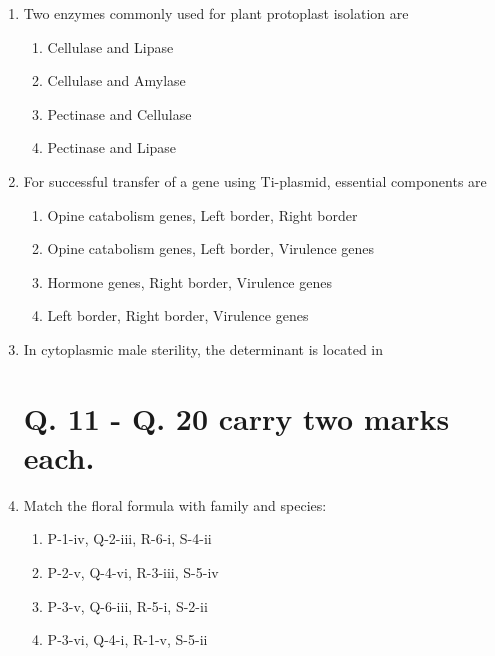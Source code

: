 \documentclass[journal]{IEEEtran}
\begin{document}
\begin{enumerate}
\item Two enzymes commonly used for plant protoplast isolation are\hfill  \textit{}
\begin{enumerate}
    \item Cellulase and Lipase
    \item Cellulase and Amylase
    \item Pectinase and Cellulase
    \item Pectinase and Lipase
\end{enumerate}

\item For successful transfer of a gene using Ti-plasmid, essential components are\hfill  \textit{}
\begin{enumerate}
    \item Opine catabolism genes, Left border, Right border
    \item Opine catabolism genes, Left border, Virulence genes
    \item Hormone genes, Right border, Virulence genes
    \item Left border, Right border, Virulence genes
\end{enumerate}

\item In cytoplasmic male sterility, the determinant is located in\hfill  \textit{}
\begin{enumerate}
\end{enumerate}

\section*{Q. 11 - Q. 20 carry two marks each.}

\item Match the floral formula with family and species:\hfill  \textit{}
\begin{enumerate}
    \item P-1-iv, Q-2-iii, R-6-i, S-4-ii
    \item P-2-v, Q-4-vi, R-3-iii, S-5-iv
    \item P-3-v, Q-6-iii, R-5-i, S-2-ii
    \item P-3-vi, Q-4-i, R-1-v, S-5-ii
\end{enumerate}


\end{enumerate}
\end{document}
